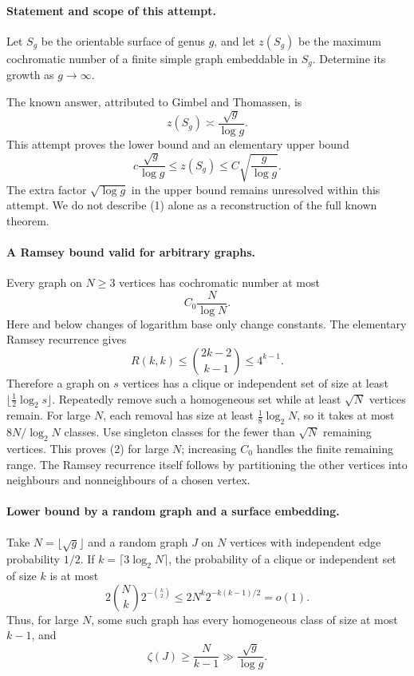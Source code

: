 \paragraph{Statement and scope of this attempt.}
Let \(S_g\) be the orientable surface of genus \(g\), and let \(z(S_g)\) be the maximum cochromatic number of a finite simple graph embeddable in \(S_g\). Determine its growth as \(g\to\infty\).

The known answer, attributed to Gimbel and Thomassen, is
\[
 z(S_g)\asymp\frac{\sqrt g}{\log g}.
\]
This attempt proves the lower bound and an elementary upper bound
\[
 c\frac{\sqrt g}{\log g}
 \leq z(S_g)\leq C\sqrt{\frac g{\log g}}. \tag{1}
\]
The extra factor \(\sqrt{\log g}\) in the upper bound remains unresolved within this attempt. We do not describe (1) alone as a reconstruction of the full known theorem.

\paragraph{A Ramsey bound valid for arbitrary graphs.}
Every graph on \(N\geq3\) vertices has cochromatic number at most
\[
 C_0\frac{N}{\log N}. \tag{2}
\]
Here and below changes of logarithm base only change constants. The elementary Ramsey recurrence gives
\[
 R(k,k)\leq\binom{2k-2}{k-1}\leq4^{k-1}.
\]
Therefore a graph on \(s\) vertices has a clique or independent set of size at least \(\lfloor\tfrac12\log_2s\rfloor\). Repeatedly remove such a homogeneous set while at least \(\sqrt N\) vertices remain. For large \(N\), each removal has size at least \(\tfrac18\log_2N\), so it takes at most \(8N/\log_2N\) classes. Use singleton classes for the fewer than \(\sqrt N\) remaining vertices. This proves (2) for large \(N\); increasing \(C_0\) handles the finite remaining range. The Ramsey recurrence itself follows by partitioning the other vertices into neighbours and nonneighbours of a chosen vertex.

\paragraph{Lower bound by a random graph and a surface embedding.}
Take \(N=\lfloor\sqrt g\rfloor\) and a random graph \(J\) on \(N\) vertices with independent edge probability \(1/2\). If \(k=\lceil3\log_2N\rceil\), the probability of a clique or independent set of size \(k\) is at most
\[
 2\binom Nk2^{-\binom k2}
 \leq2N^k2^{-k(k-1)/2}=o(1).
\]
Thus, for large \(N\), some such graph has every homogeneous class of size at most \(k-1\), and
\[
 \zeta(J)\geq\frac{N}{k-1}\gg\frac{\sqrt g}{\log g}. \tag{3}
\]

